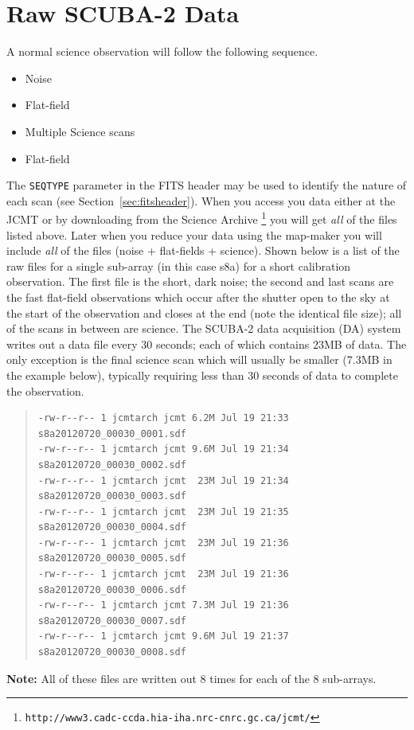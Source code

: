 \documentclass[twoside,11pt]{article}
\newcommand{\htmladdnormallink}[2]{#1}
\newcommand{\htmlref}[2]{#1}
\newenvironment{latexonly}{}{}
\newcommand{\latexhtml}[2]{#1}
\newcommand{\xlabel}[1]{}
\renewcommand{\_}{\texttt{\symbol{95}}}
\newenvironment{myquote}{\begin{quote}\begin{small}}{\end{small}\end{quote}}
\newcommand{\param}[1]{\texttt{#1}}
\newcommand{\cref}[3]{\latexhtml{#1~\ref{#2}}{\htmlref{#3}{#2}}}
\begin{document}
\section{\xlabel{data_files}Raw SCUBA-2 Data}
\label{sec:raw}
A normal science observation will follow the following sequence.
\vspace{-2mm}
\begin{itemize}\itemsep-0.5em
\item Noise
\item Flat-field
\item Multiple Science scans
\item Flat-field
\end{itemize}
\vspace{-2mm}
The \param{SEQ\_TYPE} parameter in the FITS header may be used to
identify the nature of each scan (see
\cref{Section}{sec:fitsheader}{Headers and file structure}).
When you access you data either at the JCMT or by downloading from the
\htmladdnormallink{Science Archive}{http://www3.cadc-ccda.hia-iha.nrc-cnrc.gc.ca/jcmt/}
\begin{latexonly}
\footnote{\texttt{http://www3.cadc-ccda.hia-iha.nrc-cnrc.gc.ca/jcmt/}}
\end{latexonly}
you will get \emph{all} of the files listed above. Later when you
reduce your data using the map-maker you will include \emph{all} of
the files (noise + flat-fields + science).
Shown below is a list of the raw files for a single sub-array (in this
case s8a) for a short calibration observation. The first file is the
short, dark noise; the second and last scans are the fast flat-field
observations which occur after the shutter open to the sky at the
start of the observation and closes at the end (note the identical
file size); all of the scans in between are science. The SCUBA-2 data
acquisition (DA) system writes out a data file every 30 seconds; each
of which contains 23MB of data. The only exception is the final science
scan which will usually be smaller (7.3MB in the example below), typically
requiring less than 30 seconds of data to complete the observation.
\begin{myquote}
\begin{verbatim}
-rw-r--r-- 1 jcmtarch jcmt 6.2M Jul 19 21:33 s8a20120720_00030_0001.sdf
-rw-r--r-- 1 jcmtarch jcmt 9.6M Jul 19 21:34 s8a20120720_00030_0002.sdf
-rw-r--r-- 1 jcmtarch jcmt  23M Jul 19 21:34 s8a20120720_00030_0003.sdf
-rw-r--r-- 1 jcmtarch jcmt  23M Jul 19 21:35 s8a20120720_00030_0004.sdf
-rw-r--r-- 1 jcmtarch jcmt  23M Jul 19 21:36 s8a20120720_00030_0005.sdf
-rw-r--r-- 1 jcmtarch jcmt  23M Jul 19 21:36 s8a20120720_00030_0006.sdf
-rw-r--r-- 1 jcmtarch jcmt 7.3M Jul 19 21:36 s8a20120720_00030_0007.sdf
-rw-r--r-- 1 jcmtarch jcmt 9.6M Jul 19 21:37 s8a20120720_00030_0008.sdf
\end{verbatim}
\end{myquote}
\textbf{Note:} All of these files are written out 8 times for each of the
8 sub-arrays.
\end{document}
